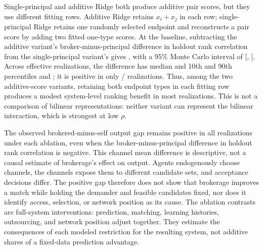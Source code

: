Single-principal and additive Ridge both produce additive pair scores, but they
use different fitting rows. Additive Ridge retains $x_i+x_j$ in each row;
single-principal Ridge retains one randomly selected endpoint and reconstructs
a pair score by adding two fitted one-type scores. At the baseline, subtracting
the additive variant's broker-minus-principal difference in holdout rank
correlation from the single-principal variant's gives
, with a 95\% Monte Carlo interval of
[,
]. Across effective realizations,
the difference has median  and 10th and
90th percentiles  and
; it is positive in only
/ realizations.
Thus, among the two additive-score variants, retaining both endpoint types in
each fitting row produces a modest system-level ranking benefit in most
realizations. This is not a comparison of bilinear representations: neither
variant can represent the bilinear interaction, which is strongest at low
$\rho$.

The observed brokered-minus-self output gap remains positive in all
 realizations under each ablation, even when the
broker-minus-principal difference in holdout rank correlation is negative. This
channel mean difference is descriptive, not a causal
estimate of brokerage's effect on output. Agents endogenously choose channels,
the channels expose them to different candidate sets, and acceptance decisions
differ. The positive gap therefore does not show that brokerage improves a
match while holding the demander and feasible candidates fixed, nor does it
identify access, selection, or network position as its cause. The ablation
contrasts are full-system interventions: prediction, matching, learning
histories, outsourcing, and network position adjust together. They estimate
the consequences of each modeled restriction for the resulting system, not
additive shares of a fixed-data prediction advantage.
